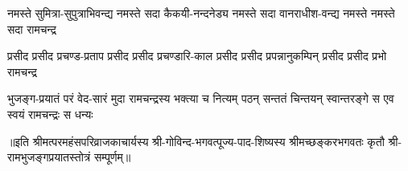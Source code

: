 \fourlineindentedshloka
{नमस्ते सुमित्रा-सुपुत्राभिवन्द्य}
{नमस्ते सदा कैकयी-नन्दनेड्य}
{नमस्ते सदा वानराधीश-वन्द्य}
{नमस्ते नमस्ते सदा रामचन्द्र}%

\fourlineindentedshloka
{प्रसीद प्रसीद प्रचण्ड-प्रताप}
{प्रसीद प्रसीद प्रचण्डारि-काल}
{प्रसीद प्रसीद प्रपन्नानुकम्पिन्}
{प्रसीद प्रसीद प्रभो रामचन्द्र}%

\fourlineindentedshloka
{भुजङ्ग-प्रयातं परं वेद-सारं}
{मुदा रामचन्द्रस्य भक्त्या च नित्यम्}
{पठन् सन्ततं चिन्तयन् स्वान्तरङ्गे}
{स एव स्वयं रामचन्द्रः स धन्यः}%

{॥इति श्रीमत्परमहंसपरिव्राजकाचार्यस्य श्री-गोविन्द-भगवत्पूज्य-पाद-शिष्यस्य
श्रीमच्छङ्करभगवतः कृतौ श्री-रामभुजङ्गप्रयातस्तोत्रं सम्पूर्णम्॥}

\closesub
